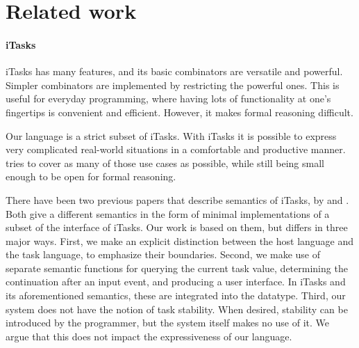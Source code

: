 


\section{Related work}
\label{sec:relatedwork}



\paragraph{iTasks}

iTasks has many features, and its basic combinators are versatile and powerful.
Simpler combinators are implemented by restricting the powerful ones.
This is useful for everyday programming, where having lots of functionality at one's fingertips is convenient and efficient.
However, it makes formal reasoning difficult.

Our language is a strict subset of iTasks.
With iTasks it is possible to express very complicated real-world situations in a comfortable and productive manner.
\TOPHAT tries to cover as many of those use cases as possible, while still being small enough to be open for formal reasoning.

There have been two previous papers that describe semantics of iTasks, by \citet{conf/ifl/KoopmanPA08} and \citet{conf/ppdp/PlasmeijerLMAK12}.
Both give a different semantics in the form of minimal implementations of a subset of the interface of iTasks.
Our work is based on them, but differs in three major ways.
First, we make an explicit distinction between the host language and the task language, to emphasize their boundaries.
Second, we make use of separate semantic functions for querying the current task value, determining the continuation after an input event, and producing a user interface.
In iTasks and its aforementioned semantics, these are integrated into the  datatype.
Third, our system does not have the notion of task stability.
When desired, stability can be introduced by the programmer, but the system itself makes no use of it.
We argue that this does not impact the expressiveness of our language.


